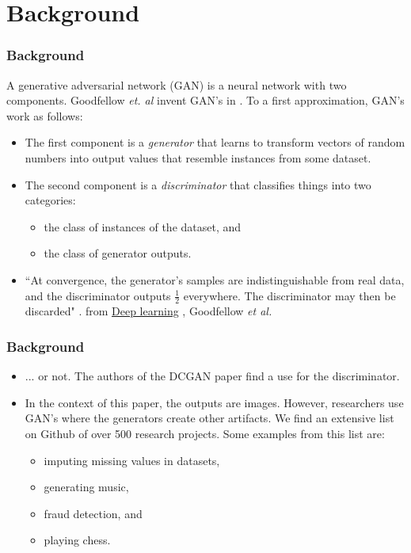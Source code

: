 \documentclass{beamer}
\begin{document}
\section{Background} 
\begin{frame}[allowframebreaks]
\frametitle{Background}
A generative adversarial network (GAN) is a neural network with two components. 
Goodfellow \textit{et. al} invent GAN's in \cite{gan}. To a first approximation,
GAN's work as follows:
\begin{itemize}
  \item The first component is a \textit{generator} that learns to transform vectors 
    of random numbers into output values that resemble instances from some dataset.  
  \item The second component is a \textit{discriminator} that classifies things into 
  two categories:
  \begin{itemize}
    \item the class of instances of the dataset, and
    \item the class of generator outputs.
  \end{itemize}
  \item ``At convergence, the generator’s samples are indistinguishable from real data,
     and the discriminator outputs $\frac{1}{2}$ everywhere. The discriminator may 
     then be discarded" \cite{deepLearnBookGenCh}. from \underline{Deep learning} , 
     Goodfellow \textit{et al.} 
\end{itemize}
\end{frame}

\begin{frame}
\frametitle{Background}
\begin{itemize}

\item ... or not.  The authors of the DCGAN paper find a use for the discriminator.
  \item In the context of this paper, the outputs are images.  However, 
   researchers use GAN's where the generators create other artifacts. We find
   an extensive list on Github  \cite{ganList} of over 500 research projects. 
   Some examples from this list are:
  \begin{itemize}
    \item imputing missing values in datasets,
    \item generating music,
    \item fraud detection, and
    \item playing chess.
  \end{itemize}
\end{itemize}
\end{frame}
\end{document}
